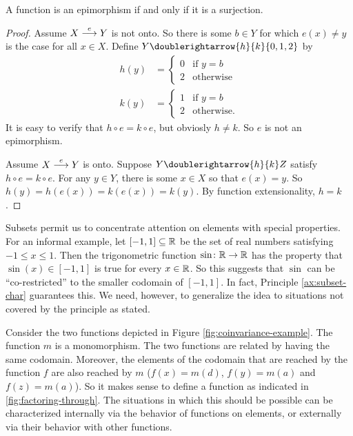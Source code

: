 \begin{lemma}
	A function is an epimorphism if and only if it is a surjection.
	
	\begin{proof}
		Assume $\sfromto eXY$ is not onto. So there is some $b\in Y$ for which $e(x)\neq y$ is the case for all $x\in X$. Define $Y\doublerightarrow{h}{k}\{0,1,2\}$ by
		\begin{align*}h(y) &= \begin{cases}
			0 &\text{if $y=b$}\\
			2 &\text{otherwise}
			\end{cases}\\
			k(y) &= \begin{cases}
			1 & \text{if $y=b$}\\
			2 &\text{otherwise.}
			\end{cases}
		\end{align*}
		It is easy to verify that $h\circ e = k\circ e$, but obviosly $h\neq k$. So $e$ is not an epimorphism.
		
		Assume $\sfromto eXY$ is onto. Suppose $Y\doublerightarrow{h}{k}Z$ 
		satisfy $h\circ e=k\circ e$. For any $y\in Y$, there is some $x\in X$ so that $e(x)=y$. So $h(y)=h(e(x))=k(e(x))=k(y)$. By function extensionality, $h=k$.
	\end{proof}
\end{lemma}

Subsets permit us to concentrate attention on elements with special properties.
For an informal example, let $[-1,1]\subseteq\RR$ be the set of real numbers satisfying $-1\leq x\leq 1$.
Then the trigonometric function $\fromto \sin\RR\RR$ has the property that $\sin(x)\in [-1,1]$ is true for every $x\in\RR$.
So this suggests that $\sin$ can be ``co-restricted'' to the smaller codomain of $[-1,1]$. In fact, Principle \ref{ax:subset-char} guarantees this.
We need, however, to generalize the idea to situations not covered by the principle as stated.

Consider the two functions depicted in Figure \ref{fig:coinvariance-example}. The function $m$ is a monomorphism. 
The two functions are related by having the same codomain. 
Moreover, the elements of the codomain that are reached by the function $f$ are also reached by $m$ ($f(x)=m(d)$, $f(y)=m(a)$ and $f(z)=m(a)$). 
So it makes sense to define a function as indicated in \ref{fig:factoring-through}. 
The situations in which this should be possible can be characterized internally via the behavior of functions on elements, or externally via their behavior with other functions. 

